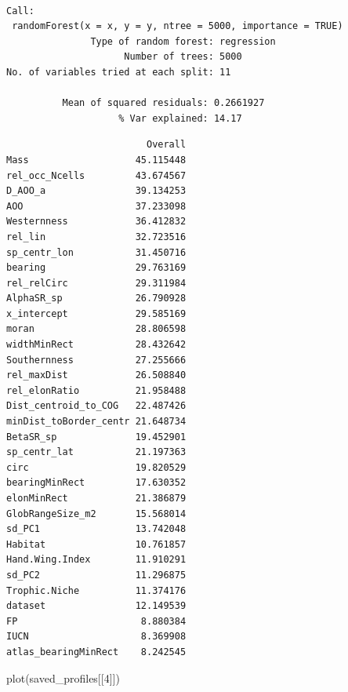 \documentclass[
  letterpaper,
  DIV=11,
  numbers=noendperiod]{scrreprt}
\newenvironment{Shaded}{\begin{snugshade}}{\end{snugshade}}
\newcommand{\DecValTok}[1]{\textcolor[rgb]{0.68,0.00,0.00}{#1}}
\newcommand{\FunctionTok}[1]{\textcolor[rgb]{0.28,0.35,0.67}{#1}}
\newcommand{\NormalTok}[1]{\textcolor[rgb]{0.00,0.23,0.31}{#1}}
\newcommand{\SpecialCharTok}[1]{\textcolor[rgb]{0.37,0.37,0.37}{#1}}
\begin{document}
\begin{Shaded}
\end{Shaded}

\begin{verbatim}

Call:
 randomForest(x = x, y = y, ntree = 5000, importance = TRUE) 
               Type of random forest: regression
                     Number of trees: 5000
No. of variables tried at each split: 11

          Mean of squared residuals: 0.2661927
                    % Var explained: 14.17
\end{verbatim}

\begin{Shaded}
\end{Shaded}

\begin{verbatim}
                         Overall
Mass                   45.115448
rel_occ_Ncells         43.674567
D_AOO_a                39.134253
AOO                    37.233098
Westernness            36.412832
rel_lin                32.723516
sp_centr_lon           31.450716
bearing                29.763169
rel_relCirc            29.311984
AlphaSR_sp             26.790928
x_intercept            29.585169
moran                  28.806598
widthMinRect           28.432642
Southernness           27.255666
rel_maxDist            26.508840
rel_elonRatio          21.958488
Dist_centroid_to_COG   22.487426
minDist_toBorder_centr 21.648734
BetaSR_sp              19.452901
sp_centr_lat           21.197363
circ                   19.820529
bearingMinRect         17.630352
elonMinRect            21.386879
GlobRangeSize_m2       15.568014
sd_PC1                 13.742048
Habitat                10.761857
Hand.Wing.Index        11.910291
sd_PC2                 11.296875
Trophic.Niche          11.374176
dataset                12.149539
FP                      8.880384
IUCN                    8.369908
atlas_bearingMinRect    8.242545
\end{verbatim}

\begin{Shaded}
\begin{Highlighting}[]
\FunctionTok{plot}\NormalTok{(saved\_profiles[[}\DecValTok{4}\NormalTok{]])}
\end{Highlighting}
\end{Shaded}
\end{document}
